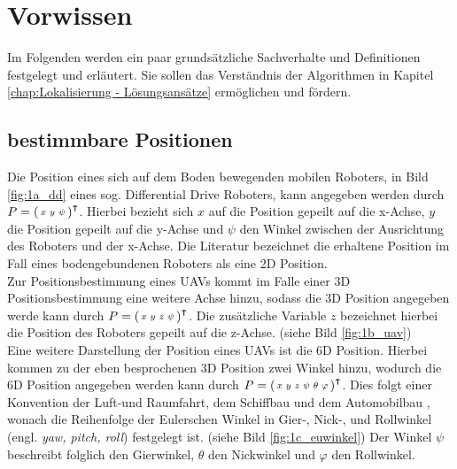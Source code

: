 \clearpage
\chapter{\textbf{Vorwissen}}\label{chap:Vorwissen}
Im Folgenden werden ein paar grundsätzliche Sachverhalte und Definitionen festgelegt und erläutert. Sie sollen das Verständnis der Algorithmen in Kapitel \ref{chap:Lokalisierung - Lösungsansätze} ermöglichen und fördern. 


\section{bestimmbare Positionen}\label{sec:bestimmbare Positionen}
Die Position eines sich auf dem Boden bewegenden mobilen Roboters, in Bild \ref{fig:1a_dd}  eines sog. Differential Drive Roboters, kann angegeben werden durch 
$P=\mathbf{\begin{psmallmatrix}
x & y & \psi
\end{psmallmatrix}}^\intercal$.
Hierbei bezieht sich $x$ auf die Position gepeilt auf die x-Achse, $y$ die Position gepeilt auf die y-Achse und $\psi$  den Winkel zwischen der Ausrichtung des Roboters und der x-Achse. Die Literatur bezeichnet die erhaltene Position im Fall eines bodengebundenen Roboters als eine 2D Position.\\
Zur Positionsbestimmung eines UAVs kommt im Falle einer 3D Positionsbestimmung eine weitere Achse hinzu, sodass die 3D Position angegeben werde kann durch
$P=\mathbf{\begin{psmallmatrix}
x & y & z & \psi
\end{psmallmatrix}}^\intercal$.
Die zusätzliche Variable $z$ bezeichnet hierbei die Position des Roboters gepeilt auf die z-Achse. (siehe Bild \ref{fig:1b_uav})\\
Eine weitere Darstellung der Position eines UAVs ist die 6D Position. Hierbei kommen zu der eben besprochenen 3D Position zwei Winkel hinzu, wodurch die 6D Position angegeben werden kann durch
$P=\mathbf{\begin{psmallmatrix}
x & y & z & \psi & \theta & \varphi
\end{psmallmatrix}}^\intercal$.
Dies folgt einer Konvention der Luft-und Raumfahrt, dem Schiffbau und dem Automobilbau \cite{website:cosmos-indirekt}, wonach die Reihenfolge der Eulerschen Winkel in Gier-, Nick-, und Rollwinkel (engl. \textit{yaw, pitch, roll}) festgelegt ist. (siehe Bild \ref{fig:1c_euwinkel}) Der Winkel $\psi$ beschreibt folglich den Gierwinkel, $\theta$ den Nickwinkel und $\varphi$ den Rollwinkel. %
